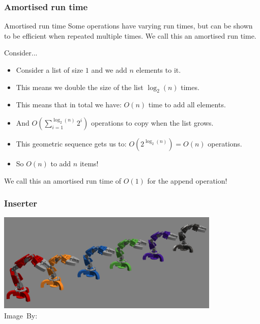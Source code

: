 \begin{frame}
	\frametitle{Amortised run time}
	\begin{block}{Amortised run time}
		Some operations have varying run times, but can be shown to be efficient when repeated multiple times. We call
		this an amortised run time.
	\end{block}	
	\pause
	\begin{block}{Consider...}
		\small
		\begin{itemize}
			\item Consider a list of size $1$ and we add $n$ elements to it.
				\vspace{-5pt}
				\pause
			\item This means we double the size of the list $\log_2(n)$ times.
				\vspace{-5pt}
				\pause
			\item This means that in total we have: $O(n)$ time to add all elements.
				\vspace{-5pt}
				\pause
			\item And $O\left(\sum\limits_{i=1}^{\log_2(n)} 2^i\right)$ operations to copy when the list grows.
				\vspace{-5pt}
			\item This geometric sequence gets us to: $O(2^{\log_2(n)}) = O(n)$ operations.
				\vspace{-5pt}
				\pause
			\item So $O(n)$ to add $n$ items!
				\vspace{-5pt}
		\end{itemize}
		\pause
		We call this an amortised run time of $O(1)$ for the append operation!
	\end{block}	
\end{frame}

\begin{frame}
	\frametitle{Inserter}
	\begin{center}
		\includegraphics[width=0.8\textwidth]{images/inserter.png}\\
		\hspace*{15pt}\hbox{\scriptsize Image By:}
	\end{center}
\end{frame}

